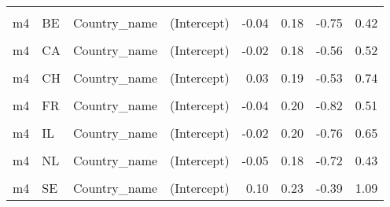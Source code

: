 \begin{table}
\begin{tabular}[t]{llllrrrr}
\cellcolor{gray!10}{m3.1} & \cellcolor{gray!10}{US} & \cellcolor{gray!10}{Country\_name} & \cellcolor{gray!10}{EPS} & \cellcolor{gray!10}{0.15} & \cellcolor{gray!10}{0.11} & \cellcolor{gray!10}{-0.10} & \cellcolor{gray!10}{0.39}\\
m4 & BE & Country\_name & (Intercept) & -0.04 & 0.18 & -0.75 & 0.42\\
\cellcolor{gray!10}{m4} & \cellcolor{gray!10}{BE} & \cellcolor{gray!10}{Country\_name} & \cellcolor{gray!10}{EPS} & \cellcolor{gray!10}{-0.09} & \cellcolor{gray!10}{0.10} & \cellcolor{gray!10}{-0.32} & \cellcolor{gray!10}{0.14}\\
m4 & CA & Country\_name & (Intercept) & -0.02 & 0.18 & -0.56 & 0.52\\
\cellcolor{gray!10}{m4} & \cellcolor{gray!10}{CA} & \cellcolor{gray!10}{Country\_name} & \cellcolor{gray!10}{EPS} & \cellcolor{gray!10}{-0.03} & \cellcolor{gray!10}{0.10} & \cellcolor{gray!10}{-0.24} & \cellcolor{gray!10}{0.20}\\
m4 & CH & Country\_name & (Intercept) & 0.03 & 0.19 & -0.53 & 0.74\\
\cellcolor{gray!10}{m4} & \cellcolor{gray!10}{CH} & \cellcolor{gray!10}{Country\_name} & \cellcolor{gray!10}{EPS} & \cellcolor{gray!10}{0.08} & \cellcolor{gray!10}{0.09} & \cellcolor{gray!10}{-0.13} & \cellcolor{gray!10}{0.28}\\
m4 & FR & Country\_name & (Intercept) & -0.04 & 0.20 & -0.82 & 0.51\\
\cellcolor{gray!10}{m4} & \cellcolor{gray!10}{FR} & \cellcolor{gray!10}{Country\_name} & \cellcolor{gray!10}{EPS} & \cellcolor{gray!10}{-0.11} & \cellcolor{gray!10}{0.10} & \cellcolor{gray!10}{-0.35} & \cellcolor{gray!10}{0.10}\\
m4 & IL & Country\_name & (Intercept) & -0.02 & 0.20 & -0.76 & 0.65\\
\cellcolor{gray!10}{m4} & \cellcolor{gray!10}{IL} & \cellcolor{gray!10}{Country\_name} & \cellcolor{gray!10}{EPS} & \cellcolor{gray!10}{-0.01} & \cellcolor{gray!10}{0.17} & \cellcolor{gray!10}{-0.43} & \cellcolor{gray!10}{0.40}\\
m4 & NL & Country\_name & (Intercept) & -0.05 & 0.18 & -0.72 & 0.43\\
\cellcolor{gray!10}{m4} & \cellcolor{gray!10}{NL} & \cellcolor{gray!10}{Country\_name} & \cellcolor{gray!10}{EPS} & \cellcolor{gray!10}{-0.09} & \cellcolor{gray!10}{0.10} & \cellcolor{gray!10}{-0.31} & \cellcolor{gray!10}{0.12}\\
m4 & SE & Country\_name & (Intercept) & 0.10 & 0.23 & -0.39 & 1.09\\

\end{tabular}
\end{table}
